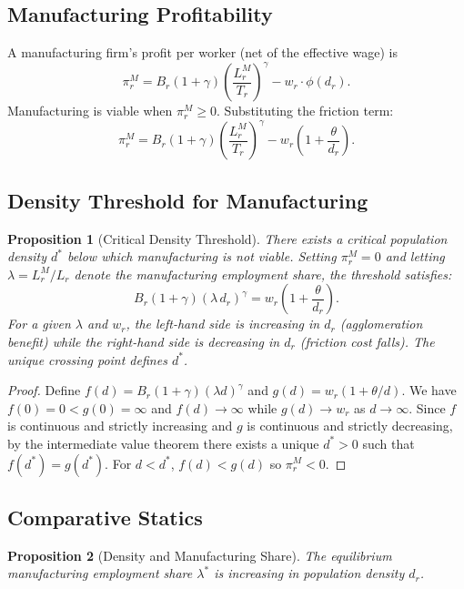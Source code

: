 \documentclass[12pt]{article}
\newtheorem{proposition}{Proposition}
\begin{document}
\subsection{Manufacturing Profitability}

A manufacturing firm's profit per worker (net of the effective wage) is
\[
    \pi_r^M = B_r (1+\gamma) \left(\frac{L_r^M}{T_r}\right)^\gamma - w_r \cdot \phi(d_r).
\]
Manufacturing is viable when $\pi_r^M \geq 0$. Substituting the friction term:
\[
    \pi_r^M = B_r (1+\gamma) \left(\frac{L_r^M}{T_r}\right)^\gamma - w_r \left(1 + \frac{\theta}{d_r}\right).
\]

\subsection{Density Threshold for Manufacturing}

\begin{proposition}[Critical Density Threshold]
There exists a critical population density $d^*$ below which manufacturing is not viable. Setting $\pi_r^M = 0$ and letting $\lambda = L_r^M / L_r$ denote the manufacturing employment share, the threshold satisfies:
\[
    B_r (1+\gamma)(\lambda \, d_r)^\gamma = w_r\left(1 + \frac{\theta}{d_r}\right).
\]
For a given $\lambda$ and $w_r$, the left-hand side is increasing in $d_r$ (agglomeration benefit) while the right-hand side is decreasing in $d_r$ (friction cost falls). The unique crossing point defines $d^*$.
\end{proposition}

\begin{proof}
Define $f(d) = B_r(1+\gamma)(\lambda d)^\gamma$ and $g(d) = w_r(1 + \theta/d)$. We have $f(0) = 0 < g(0) = \infty$ and $f(d) \to \infty$ while $g(d) \to w_r$ as $d \to \infty$. Since $f$ is continuous and strictly increasing and $g$ is continuous and strictly decreasing, by the intermediate value theorem there exists a unique $d^* > 0$ such that $f(d^*) = g(d^*)$. For $d < d^*$, $f(d) < g(d)$ so $\pi_r^M < 0$.
\end{proof}

\subsection{Comparative Statics}

\begin{proposition}[Density and Manufacturing Share]
The equilibrium manufacturing employment share $\lambda^*$ is increasing in population density $d_r$.
\end{proposition}
\end{document}
